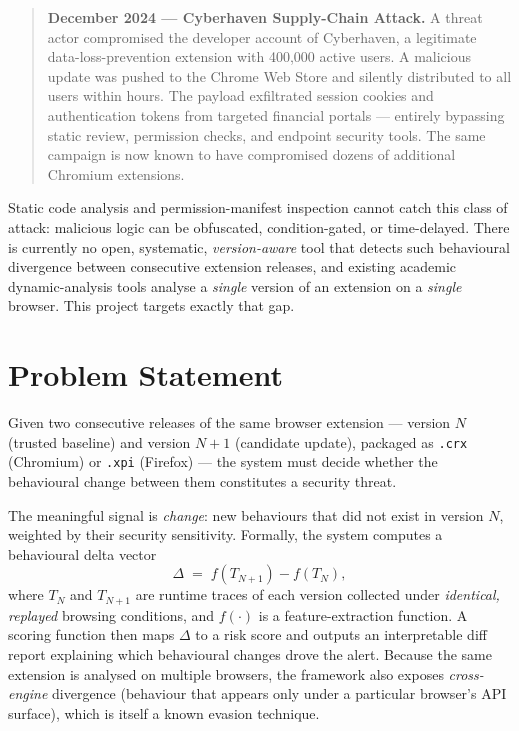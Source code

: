 \documentclass[11pt]{article}
\begin{document}
\begin{quote}
\textbf{December 2024 --- Cyberhaven Supply-Chain Attack.} A threat actor compromised the developer
account of Cyberhaven, a legitimate data-loss-prevention extension with 400,000 active users. A
malicious update was pushed to the Chrome Web Store and silently distributed to all users within
hours. The payload exfiltrated session cookies and authentication tokens from targeted financial
portals --- entirely bypassing static review, permission checks, and endpoint security tools. The
same campaign is now known to have compromised dozens of additional Chromium extensions.
\end{quote}

Static code analysis and permission-manifest inspection cannot catch this class of attack: malicious
logic can be obfuscated, condition-gated, or time-delayed. There is currently no open, systematic,
\emph{version-aware} tool that detects such behavioural divergence between consecutive extension
releases, and existing academic dynamic-analysis tools analyse a \emph{single} version of an
extension on a \emph{single} browser. This project targets exactly that gap.

\section{Problem Statement}
Given two consecutive releases of the same browser extension --- version $N$ (trusted baseline) and
version $N{+}1$ (candidate update), packaged as \texttt{.crx} (Chromium) or \texttt{.xpi}
(Firefox) --- the system must decide whether the behavioural change between them constitutes a
security threat.

The meaningful signal is \emph{change}: new behaviours that did not exist in version $N$, weighted by
their security sensitivity. Formally, the system computes a behavioural delta vector
\[
    \Delta \;=\; f(T_{N+1}) - f(T_{N}),
\]
where $T_N$ and $T_{N+1}$ are runtime traces of each version collected under \emph{identical,
replayed} browsing conditions, and $f(\cdot)$ is a feature-extraction function. A scoring function
then maps $\Delta$ to a risk score and outputs an interpretable diff report explaining which
behavioural changes drove the alert. Because the same extension is analysed on multiple browsers,
the framework also exposes \emph{cross-engine} divergence (behaviour that appears only under a
particular browser's API surface), which is itself a known evasion technique.
\end{document}
